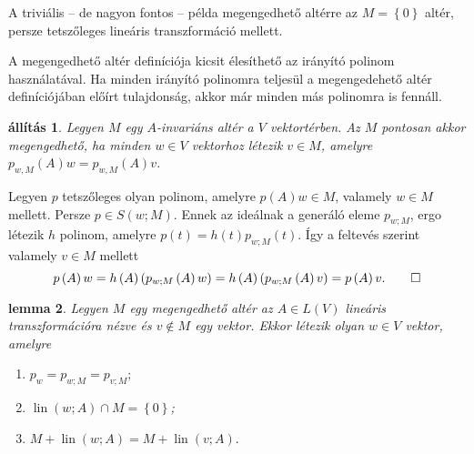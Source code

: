 \documentclass[a4paper, showtrims]{memoir}
\makeatletter
\renewenvironment{proof}[1][\proofname]
    {\par\pushQED{\qed}%
    \normalfont \topsep6\p@\@plus6\p@\relax
    \trivlist
    \item[\hskip\labelsep
        \itshape
    #1\@addpunct{:}]\ignorespaces}
    {\popQED\endtrivlist\@endpefalse}
\theoremstyle{plain}
\newtheorem{proposition}{állítás}[chapter]
\newtheorem{lemma}[proposition]{lemma}
\theoremstyle{remark}
\theoremstyle{definition}
\DeclareMathOperator{\lin}{lin}
\makeatother
\begin{document}
A triviális -- de nagyon fontos -- példa megengedhető altérre az $M=\left\{ 0 \right\}$ altér, 
persze tetszőleges lineáris transzformáció mellett.

A megengedhető altér definíciója kicsit élesíthető az irányító polinom használatával.
Ha minden irányító polinomra teljesül a megengedehető altér definíciójában előírt tulajdonság, 
akkor már minden más polinomra is fennáll.
\begin{proposition}\label{pr:megengedheto_v}
    Legyen $M$ egy $A$-invariáns altér a $V$ vektortérben.
    Az $M$ pontosan akkor megengedhető, 
    ha minden $w\in V$ vektorhoz létezik $v\in M$,
    amelyre $p_{w,M}\left( A \right)w=p_{w,M}\left( A \right)v$.
\end{proposition}
\begin{proof}
    Legyen $p$ tetszőleges olyan polinom, amelyre $p\left( A \right)w\in M$, valamely $w\in M$ mellett.
    Persze $p\in S\left( w;M \right)$.
    Ennek az ideálnak a generáló eleme $p_{w;M}$, 
    ergo létezik $h$ polinom, amelyre 
    $p\left( t \right)=h\left( t \right)p_{w;M}\left( t \right)$.
    Így a feltevés szerint valamely $v\in M$ mellett
    \begin{displaymath}
        p\left( A \right)w
        =
        h\left( A \right)\left( p_{w;M}\left( A \right)w \right)
        =
        h\left( A \right)\left( p_{w;M}\left( A \right)v \right)
        =
        p\left( A \right)v.\qedhere
    \end{displaymath}
\end{proof}
\begin{lemma}
    Legyen $M$ egy megengedhető altér az $A\in L\left( V \right)$ lineáris transzformációra nézve és $v\notin M$ egy vektor.
    Ekkor létezik olyan $w\in V$ vektor, amelyre 
    \begin{enumerate}
        \item
            \(
            p_w
            =
            p_{w;M}
            =
            p_{v;M};
            \)
        \item 
            $\lin\left( w;A \right)\cap M=\left\{ 0 \right\}$;
        \item
            \(
            M+\lin\left( w;A \right)
            =
            M+\lin\left( v;A \right).
            \)
            \qedhere
    \end{enumerate}
    \label{le:iranyito}
\end{lemma}
\end{document}
